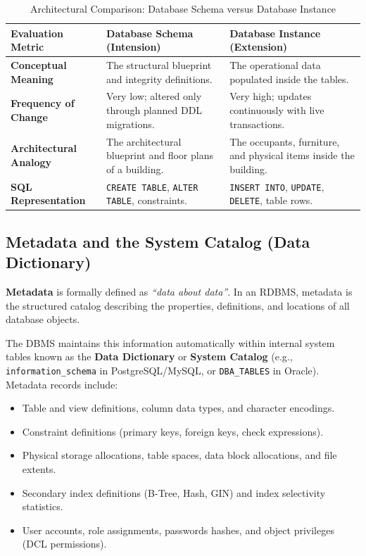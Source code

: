 \begin{table}[htbp]
\centering
\caption{Architectural Comparison: Database Schema versus Database Instance}
\label{tab:schema_vs_instance}
\begin{tabularx}{\textwidth}{p{3.2cm} X X}
\toprule
\textbf{Evaluation Metric} & \textbf{Database Schema (Intension)} & \textbf{Database Instance (Extension)} \\
\midrule
\textbf{Conceptual Meaning} & The structural blueprint and integrity definitions. & The operational data populated inside the tables. \\
\textbf{Frequency of Change} & Very low; altered only through planned DDL migrations. & Very high; updates continuously with live transactions. \\
\textbf{Architectural Analogy} & The architectural blueprint and floor plans of a building. & The occupants, furniture, and physical items inside the building. \\
\textbf{SQL Representation} & \texttt{CREATE TABLE}, \texttt{ALTER TABLE}, constraints. & \texttt{INSERT INTO}, \texttt{UPDATE}, \texttt{DELETE}, table rows. \\
\bottomrule
\end{tabularx}
\end{table}

\subsection{Metadata and the System Catalog (Data Dictionary)}

\textbf{Metadata} is formally defined as \textit{``data about data''}. In an RDBMS, metadata is the structured catalog describing the properties, definitions, and locations of all database objects. 

The DBMS maintains this information automatically within internal system tables known as the \textbf{Data Dictionary} or \textbf{System Catalog} (e.g., \texttt{information\_schema} in PostgreSQL/MySQL, or \texttt{DBA\_TABLES} in Oracle). Metadata records include:
\begin{itemize}
\item Table and view definitions, column data types, and character encodings.
\item Constraint definitions (primary keys, foreign keys, check expressions).
\item Physical storage allocations, table spaces, data block allocations, and file extents.
\item Secondary index definitions (B-Tree, Hash, GIN) and index selectivity statistics.
\item User accounts, role assignments, passwords hashes, and object privileges (DCL permissions).
\end{itemize}

